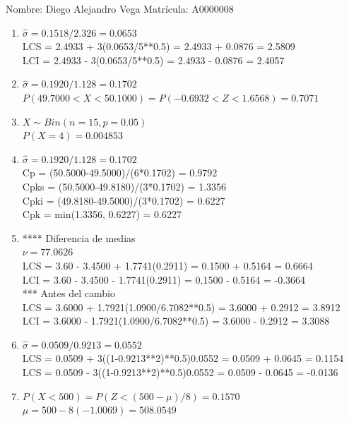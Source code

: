 \documentclass[8pt]{report}
\begin{document}
 \newpage

Nombre: \underline{\hspace*{.2in}}
Diego Alejandro Vega
\underline{\hspace*{.2in}} \quad Matr\'icula:\underline{\hspace*{.2in}}
A0000008
\underline{\hspace*{.2in}} \\

\begin{enumerate}
\item $\hat\sigma = 0.1518/2.326 = 0.0653$\\
LCS = 2.4933 + 3(0.0653/5**0.5) = 2.4933 + 0.0876 = 2.5809\\
LCI = 2.4933 - 3(0.0653/5**0.5) = 2.4933 - 0.0876 = 2.4057
\item $\hat\sigma = 0.1920/1.128 = 0.1702$\\
$P(49.7000 < X < 50.1000) = P(-0.6932 < Z < 1.6568) = 0.7071$\\
\item $X \sim Bin(n=15, p=0.05)$\\
$P(X = 4) = 0.004853$
\item $\hat\sigma = 0.1920/1.128 = 0.1702$\\
Cp = (50.5000-49.5000)/(6*0.1702) = 0.9792\\
Cpks = (50.5000-49.8180)/(3*0.1702) = 1.3356\\
Cpki = (49.8180-49.5000)/(3*0.1702) = 0.6227\\
Cpk = min(1.3356, 0.6227) = 0.6227
\item **** Diferencia de medias\\
$\nu = 77.0626$\\
LCS = 3.60 - 3.4500 + 1.7741(0.2911) = 0.1500 + 0.5164 = 0.6664\\
LCI = 3.60 - 3.4500 - 1.7741(0.2911) = 0.1500 - 0.5164 = -0.3664\\
*** Antes del cambio\\
LCS = 3.6000 + 1.7921(1.0900/6.7082**0.5) = 3.6000 + 0.2912 = 3.8912\\
LCI = 3.6000 - 1.7921(1.0900/6.7082**0.5) = 3.6000 - 0.2912 = 3.3088\\
\item $\hat\sigma = 0.0509/0.9213 = 0.0552$\\
LCS = 0.0509 + 3((1-0.9213**2)**0.5)0.0552 = 0.0509 + 0.0645 = 0.1154\\
LCS = 0.0509 - 3((1-0.9213**2)**0.5)0.0552 = 0.0509 - 0.0645 = -0.0136
\item $P(X < 500) = P(Z < (500-\mu)/8) = 0.1570$\\
$\mu = 500 - 8(-1.0069) = 508.0549$\\
\end{enumerate}
\end{document}
